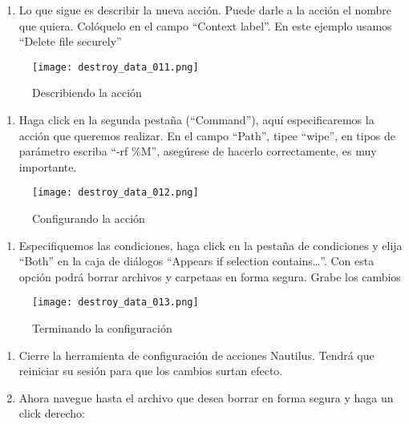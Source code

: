 \documentclass[10pt,a5paper,twoside,,]{book}
\providecommand{\tightlist}{%
  \setlength{\itemsep}{0pt}\setlength{\parskip}{0pt}}
\begin{document}
\begin{enumerate}
\def\labelenumi{\arabic{enumi}.}
\setcounter{enumi}{3}
\tightlist
\item
  Lo que sigue es describir la nueva acción. Puede darle a la acción el
  nombre que quiera. Colóquelo en el campo ``Context label''. En este
  ejemplo usamos ``Delete file securely''
\end{enumerate}

\begin{figure}[htbp]
\centering
\texttt{[image: destroy\_data\_011.png]}
\caption{Describiendo la acción}
\end{figure}

\begin{enumerate}
\def\labelenumi{\arabic{enumi}.}
\setcounter{enumi}{4}
\tightlist
\item
  Haga click en la segunda pestaña (``Command''), aquí especificaremos
  la acción que queremos realizar. En el campo ``Path'', tipee ``wipe'',
  en tipos de parámetro escriba ``-rf \%M'', asegúrese de hacerlo
  correctamente, es muy importante.
\end{enumerate}

\begin{figure}[htbp]
\centering
\texttt{[image: destroy\_data\_012.png]}
\caption{Configurando la acción}
\end{figure}

\begin{enumerate}
\def\labelenumi{\arabic{enumi}.}
\setcounter{enumi}{5}
\tightlist
\item
  Especifiquemos las condiciones, haga click en la pestaña de
  condiciones y elija ``Both'' en la caja de diálogos ``Appears if
  selection contains\ldots{}''. Con esta opción podrá borrar archivos y
  carpetaas en forma segura. Grabe los cambios
\end{enumerate}

\begin{figure}[htbp]
\centering
\texttt{[image: destroy\_data\_013.png]}
\caption{Terminando la configuración}
\end{figure}

\begin{enumerate}
\def\labelenumi{\arabic{enumi}.}
\setcounter{enumi}{6}
\item
  Cierre la herramienta de configuración de acciones Nautilus. Tendrá
  que reiniciar su sesión para que los cambios surtan efecto.
\item
  Ahora navegue hasta el archivo que desea borrar en forma segura y haga
  un click derecho:
\end{enumerate}
\end{document}
